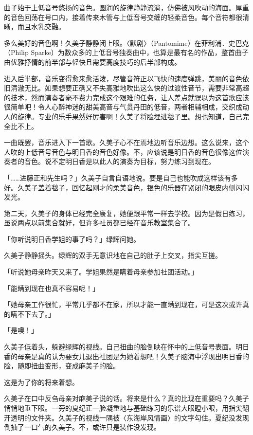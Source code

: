 \documentclass[UTF8]{ctexart}
\begin{document}
    曲子始于上低音号悠扬的音色。圆润的旋律静静流淌，仿佛被风吹动的海面。厚重的音色回荡在号口内，接着传来木管与上低音号交缠的轻柔音色。每个音符都很清晰，而且水乳交融。 

    多么美好的音色啊！久美子静静闭上眼。〈默剧〉（Pantomime）在菲利浦．史巴克（Philip Sparke）为数众多的上低音号独奏曲中，也算是最有名的作品，整首曲子由优雅抒情的前半部与轻快且需要高度技巧的后半部构成。 

    进入后半部，音乐变得愈来愈活泼，尽管音符正以飞快的速度弹跳，美丽的音色依旧清澈无比。如果想要正确又不失高雅地吹出这么快的过渡性音节，需要非常高超的技术，然而演奏者毫不费力完成这个艰难的任务，让人差点就误以为这首歌应该很简单吧！令人心醉神迷的甜美高音与气贯丹田的低音，两者相辅相成，交织成动人的旋律。专业的乐手果然好厉害啊！久美子将脸埋进毯子里。想也知道，自己完全比不上。 

    一曲既罢，音乐进入下一首歌。久美子心不在焉地边听音乐边想。这么说来，这个人吹的上低音号音色与明日香的音色好像。不，应该说是明日香的音色很像这位演奏者的音色。说不定明日香是以此人的演奏为目标，努力练习到现在。 

    「……进藤正和先生吗？」久美子自言自语地说。要是自己也能吹成这样该有多好。久美子盖着毯子，回忆起刚才的柔美音色，银色的乐器在紧闭的眼皮内侧闪闪发光。 

    第二天，久美子的身体已经完全康复，她便跟平常一样去学校。因为是假日练习，虽说两点以前集合就好，但许多社员都已经在音乐教室集合了。 

    「你听说明日香学姐的事了吗？」绿辉问她。 

    久美子静静摇头。绿辉的双手无意识地在自己的肚子上交叉，指尖互搓。 

    「听说她母亲昨天又来了。学姐果然是瞒着母亲参加社团活动。」 

    「能瞒到现在也真不容易呢！」 

    「她母亲工作很忙，平常几乎都不在家，所以才能一直瞒到现在，可是这次或许真的瞒不下去了。」 

    「是噢！」 

    久美子低着头，躲避绿辉的视线。自己扭曲的脸倒映在怀中的上低音号表面。明日香的母亲是真的认为要女儿退出社团是为她着想吧！久美子脑海中浮现出明日香的脸，随即扭曲变形，变成麻美子的脸。 

    这是为了你的将来着想。 

    久美子在口中反刍母亲对麻美子说的话。将来是什么？真的比现在重要吗？久美子悄悄地垂下眼。一旁的夏纪正一脸凝重地与基础练习的乐谱大眼瞪小眼，用指尖翻开透明的文件夹。久美子的视线一隅被〈东海岸风情画〉的文字勾住。夏纪没发现倒抽了一口气的久美子。不，或许只是装作没发现。 
\end{document}
